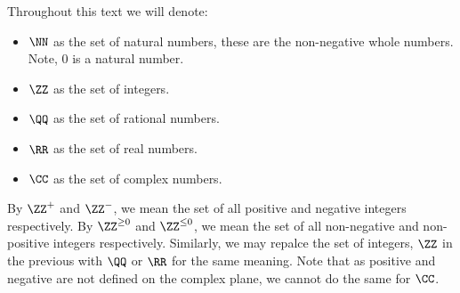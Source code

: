 \guard

Throughout this text we will denote:
\begin{itemize}
  \item $\NN$ as the set of natural numbers, these are the non-negative whole numbers.
    Note, $0$ is a natural number.
  \item $\ZZ$ as the set of integers.
  \item $\QQ$ as the set of rational numbers.
  \item $\RR$ as the set of real numbers.
  \item $\CC$ as the set of complex numbers.
\end{itemize}

By $\ZZ^+$ and $\ZZ^-$, we mean the set of all positive and negative integers respectively.
By $\ZZ^{\geq 0}$ and $\ZZ^{\leq 0}$, we mean the set of all non-negative and non-positive integers respectively.
Similarly, we may repalce the set of integers, $\ZZ$ in the previous with $\QQ$ or $\RR$ for the same meaning.
Note that as positive and negative are not defined on the complex plane, we cannot do the same for $\CC$.
